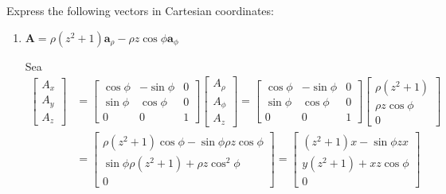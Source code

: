 \begin{problema}

Express the following vectors in Cartesian coordinates:
\begin{enumerate}
    \item $\mathbf{A}=\rho\left(z^{2}+1\right) \mathbf{a}_{\rho}-\rho z \cos \phi \mathbf{a}_{\phi}$
    \begin{sol}
        Sea 
        \begin{align*}
            \begin{bmatrix}
                A_x\\
                A_y\\
                A_z
            \end{bmatrix} &= \begin{bmatrix}
                \cos\phi &-\sin \phi  &0\\
                \sin \phi & \cos \phi & 0\\
                0 & 0 & 1
            \end{bmatrix} \begin{bmatrix}
                A_\rho\\
                A_\phi\\
                A_z
            \end{bmatrix}= \begin{bmatrix}
                \cos\phi &-\sin \phi  &0\\
                \sin \phi & \cos \phi & 0\\
                0 & 0 & 1
            \end{bmatrix} \begin{bmatrix}
                \rho (z^2+1)\\
                \rho z\cos\phi\\
                0
            \end{bmatrix}\\
            &=  \begin{bmatrix}
                \rho (z^2+1)\cos\phi -\sin \phi \rho z\cos\phi\\
                \sin\phi \rho(z^2+1)+\rho z\cos^2\phi\\
                0
            \end{bmatrix}=  \begin{bmatrix}
                (z^2+1)x -\sin \phi z x\\
                y(z^2+1)+xz\cos\phi\\
                0
            \end{bmatrix}\\

\end{align*}
\end{sol}
\end{enumerate}
\end{problema}
